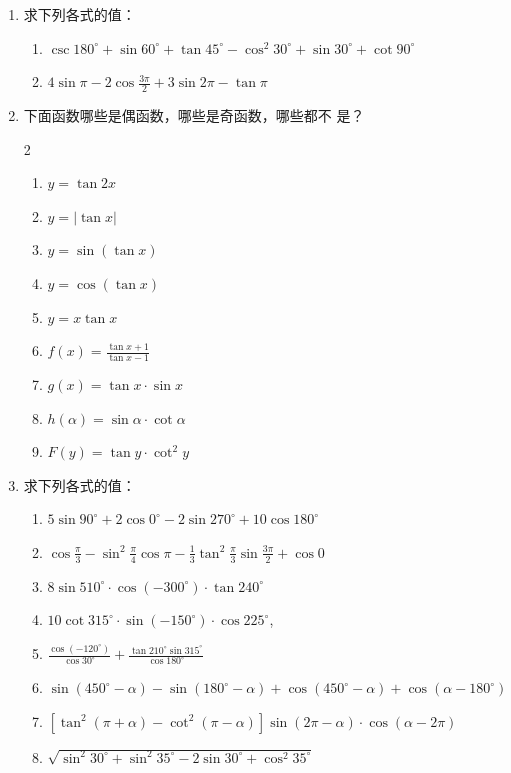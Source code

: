 \begin{enumerate}
\item 求下列各式的值：
\begin{enumerate}
    \item $\csc180^{\circ}+\sin60^{\circ}+\tan45^{\circ}-\cos^2 30^{\circ}+\sin30^{\circ}
+\cot90^{\circ}$
    \item $4\sin\pi-2\cos\frac{3\pi}{2}+3\sin2\pi -\tan\pi$
\end{enumerate}

\item 下面函数哪些是偶函数，哪些是奇函数，哪些都不
是？
\begin{multicols}{2}
\begin{enumerate}
\item $y=\tan 2 x$
\item $y=|\tan x|$
\item $y=\sin (\tan  x)$ 
\item  $y=\cos (\tan x)$
\item $y=x \tan x$
\item $f(x)=\frac{\tan x+1}{\tan x-1}$
\item $g(x)=\tan x \cdot \sin x $
\item $ h(\alpha)=\sin \alpha \cdot \cot  \alpha$
\item  $F(y)=\tan y \cdot \cot^{2} y$
\end{enumerate}
\end{multicols}
\item  求下列各式的值：
\begin{enumerate}
\item $5 \sin 90^{\circ}+2 \cos 0^{\circ}-2 \sin 270^{\circ}+10 \cos 180^{\circ}$
\item $\cos \frac{\pi}{3}-\sin ^{2} \frac{\pi}{4}\cos \pi -\frac{1}{3} \tan^{2} \frac{\pi}{3} \sin \frac{3 \pi}{2}+\cos 0$
\item $8 \sin 510^{\circ} \cdot \cos \left(-300^{\circ}\right) \cdot \tan 240^{\circ}$
\item $10 \cot  315^{\circ} \cdot \sin \left(-150^{\circ}\right) \cdot \cos 225^{\circ}$,
\item $\frac{\cos \left(-120^{\circ}\right)}{\cos 30^{\circ}}+\frac{\tan 210^{\circ} \sin 315^{\circ}}{\cos 180^{\circ}}$
\item $\sin \left(450^{\circ}-\alpha\right)-\sin \left(180^{\circ}-\alpha\right) +\cos \left(450^{\circ}-\alpha\right)+\cos \left(\alpha-180^{\circ}\right)$
\item $[\tan^2(\pi+\alpha)-\cot^2(\pi-\alpha)]\sin(2\pi-\alpha)\cdot \cos(\alpha-2\pi)$
\item $\sqrt{\sin^2 30^{\circ}+\sin^2 35^{\circ}-2\sin 30^{\circ}+\cos^2 35^{\circ}}$
\end{enumerate}


\end{enumerate}
